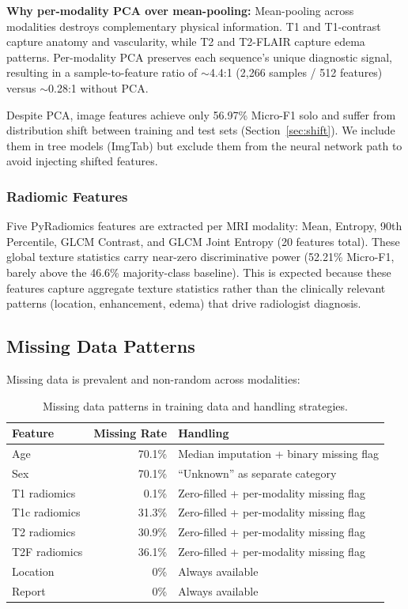\textbf{Why per-modality PCA over mean-pooling:} Mean-pooling across modalities destroys complementary physical information. T1 and T1-contrast capture anatomy and vascularity, while T2 and T2-FLAIR capture edema patterns. Per-modality PCA preserves each sequence's unique diagnostic signal, resulting in a sample-to-feature ratio of $\sim$4.4:1 (2,266 samples / 512 features) versus $\sim$0.28:1 without PCA.

Despite PCA, image features achieve only 56.97\% Micro-F1 solo and suffer from distribution shift between training and test sets (Section~\ref{sec:shift}). We include them in tree models (ImgTab) but exclude them from the neural network path to avoid injecting shifted features.

\subsubsection{Radiomic Features}

Five PyRadiomics features are extracted per MRI modality: Mean, Entropy, 90th Percentile, GLCM Contrast, and GLCM Joint Entropy (20 features total). These global texture statistics carry near-zero discriminative power (52.21\% Micro-F1, barely above the 46.6\% majority-class baseline). This is expected because these features capture aggregate texture statistics rather than the clinically relevant patterns (location, enhancement, edema) that drive radiologist diagnosis.

\subsection{Missing Data Patterns}

Missing data is prevalent and non-random across modalities:

\begin{table}[H]
\centering
\caption{Missing data patterns in training data and handling strategies.}
\label{tab:missing}
\begin{tabular}{lrl}
\toprule
\textbf{Feature} & \textbf{Missing Rate} & \textbf{Handling} \\
\midrule
Age & 70.1\% & Median imputation + binary missing flag \\
Sex & 70.1\% & ``Unknown'' as separate category \\
T1 radiomics & 0.1\% & Zero-filled + per-modality missing flag \\
T1c radiomics & 31.3\% & Zero-filled + per-modality missing flag \\
T2 radiomics & 30.9\% & Zero-filled + per-modality missing flag \\
T2F radiomics & 36.1\% & Zero-filled + per-modality missing flag \\
Location & 0\% & Always available \\
Report & 0\% & Always available \\
\bottomrule
\end{tabular}
\end{table}

